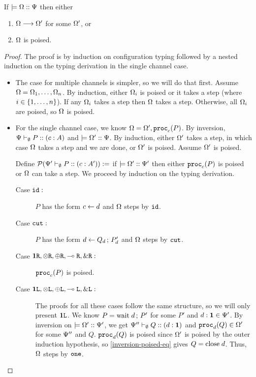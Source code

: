 \begin{theorem}[Progress]
If $\models {\Omega} :: {\Psi}$ then either
\begin{enumerate}
  \item $\Omega \longrightarrow \Omega'$ for some $\Omega'$, or
  \item $\Omega$ is poised.
\end{enumerate}

\end{theorem}
\begin{proof}
The proof is by induction on configuration typing followed by a nested induction on the typing derivation in the single channel case.

\begin{itemize}
  \item The case for multiple channels is simpler, so we will do that first. Assume $\Omega = \Omega_1, \ldots, \Omega_n$. By induction, either $\Omega_i$ is poised or it takes a step (where $i \in \lbrace1, \ldots, n\rbrace$). If any $\Omega_i$ takes a step then $\Omega$ takes a step. Otherwise, all $\Omega_i$ are poised, so $\Omega$ is poised.

  \item For the single channel case, we know $\Omega = \Omega', \mathtt{proc}_{c}(P)$. By inversion, ${\Psi} \vdash_{\emptyset} P :: (c : A)$ and $\models {\Omega'} :: {\Psi}$. By induction, either $\Omega'$ takes a step, in which case $\Omega$ takes a step and we are done, or $\Omega'$ is poised. Assume $\Omega'$ is poised.

  Define $\pred{\typeRecD{\ctx'}{\emptyset}{P}{c}{A'}} :=$ if $\models {\Omega'} :: {\Psi'}$ then either $\mathtt{proc}_{c}(P)$ is poised or $\Omega$ can take a step. We proceed by induction on the typing derivation.
    \begin{description}
      \item[Case $\texttt{id}:$] $P$ has the form $c \leftarrow d$ and $\Omega$ steps by $\texttt{id}$.
      \item[Case $\texttt{cut}:$] $P$ has the form $d \leftarrow Q_d \,;\, P'_d$ and $\Omega$ steps by $\texttt{cut}$.

      \item[Case $\mathbf{1}\texttt{R}, \otimes\texttt{R}, \oplus\texttt{R}, \multimap\texttt{R}, \&\texttt{R} :$] $\mathtt{proc}_{c}(P)$ is poised.

      \item[Case $\mathbf{1}\texttt{L}, \otimes\texttt{L}, \oplus\texttt{L}, \multimap\texttt{L}, \&\texttt{L} :$] The proofs for all these cases follow the same structure, so we will only present $\mathbf{1}\texttt{L}$. We know $P = \mathrm{wait}\;d \,;\, P'$ for some $P'$ and $d : \mathbf{1} \in \Psi'$. By inversion on $\models {\Omega'} :: {\Psi'}$, we get ${\Psi''} \vdash_{\emptyset} Q :: (d : \mathbf{1})$ and $\mathtt{proc}_{d}(Q) \in \Omega'$ for some $\Psi''$ and $Q$. $\mathtt{proc}_{d}(Q)$ is poised since $\Omega'$ is poised by the outer induction hypothesis, so \cref{inversion-poised-eq} gives $Q = \mathrm{close}\;d$. Thus, $\Omega$ steps by $\texttt{one}$.


\end{description}
\end{itemize}
\end{proof}
